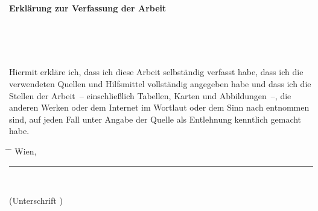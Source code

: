 \vspace*{7.0cm}
\begin{center}
   \thesistitlefontLarge\sffamily\bfseries{Erklärung zur Verfassung der Arbeit}
\end{center}
\vspace*{1.5cm}
\begin{flushright}
   \tuinfthesisauthor\\\tuinfthesisaddress\\\tuinfthesiszipcode~\tuinfthesiscity
\end{flushright}
\vspace*{1.5cm}
Hiermit erkläre ich, dass ich diese Arbeit selbständig verfasst habe, dass ich 
die verwendeten Quellen und Hilfsmittel vollständig angegeben habe und dass ich 
die Stellen der Arbeit~-- einschließlich Tabellen, Karten und Abbildungen~--, 
die anderen Werken oder dem Internet im Wortlaut oder dem Sinn nach entnommen 
sind, auf jeden Fall unter Angabe der Quelle als Entlehnung kenntlich gemacht
habe.
\begin{minipage}[t][2cm][t]{\textwidth}
\vspace{1.5cm}
   \begin{tabbing}
      \hspace{66mm} \= \hspace{66mm} \= \hspace{51mm} \kill
      Wien, \tuinfthesisdate \> {\raggedright\rule{51mm}{0.5pt}} \> \\ \> 
      \begin{minipage}[t][0.5cm][t]{51mm}
         \centering (Unterschrift \tuinfthesisverfassung)
      \end{minipage}
   \end{tabbing}
\end{minipage}
\vspace*{1.5cm}

\pagestyle{empty}
\cleardoublepage


\setlength{\baselineskip}{\tmpbaselineskip}
\setlength{\parindent}{\tmpparindent}

\restoregeometry
